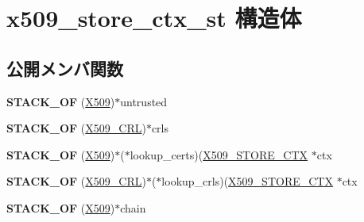 \hypertarget{structx509__store__ctx__st}{}\section{x509\+\_\+store\+\_\+ctx\+\_\+st 構造体}
\label{structx509__store__ctx__st}
\subsection*{公開メンバ関数}
\begin{DoxyCompactItemize}
\item 
\hypertarget{structx509__store__ctx__st_a546a89dab72d8fa5a48a6d250bf2f320}{}{\bfseries S\+T\+A\+C\+K\+\_\+\+O\+F} (\hyperlink{structx509__st}{X509})$\ast$untrusted\label{structx509__store__ctx__st_a546a89dab72d8fa5a48a6d250bf2f320}

\item 
\hypertarget{structx509__store__ctx__st_a97b2a77c7beeea1cf73a0ad5243f2d98}{}{\bfseries S\+T\+A\+C\+K\+\_\+\+O\+F} (\hyperlink{struct_x509__crl__st}{X509\+\_\+\+C\+R\+L})$\ast$crls\label{structx509__store__ctx__st_a97b2a77c7beeea1cf73a0ad5243f2d98}

\item 
\hypertarget{structx509__store__ctx__st_a5b90bf307077e1d7f416088bfaa39173}{}{\bfseries S\+T\+A\+C\+K\+\_\+\+O\+F} (\hyperlink{structx509__st}{X509})$\ast$($\ast$lookup\+\_\+certs)(\hyperlink{structx509__store__ctx__st}{X509\+\_\+\+S\+T\+O\+R\+E\+\_\+\+C\+T\+X} $\ast$ctx\label{structx509__store__ctx__st_a5b90bf307077e1d7f416088bfaa39173}

\item 
\hypertarget{structx509__store__ctx__st_a74148f9c29f0ba50528f877662006709}{}{\bfseries S\+T\+A\+C\+K\+\_\+\+O\+F} (\hyperlink{struct_x509__crl__st}{X509\+\_\+\+C\+R\+L})$\ast$($\ast$lookup\+\_\+crls)(\hyperlink{structx509__store__ctx__st}{X509\+\_\+\+S\+T\+O\+R\+E\+\_\+\+C\+T\+X} $\ast$ctx\label{structx509__store__ctx__st_a74148f9c29f0ba50528f877662006709}

\item 
\hypertarget{structx509__store__ctx__st_a9eecfd0e612ad76c36ffaab1fff26ae8}{}{\bfseries S\+T\+A\+C\+K\+\_\+\+O\+F} (\hyperlink{structx509__st}{X509})$\ast$chain\label{structx509__store__ctx__st_a9eecfd0e612ad76c36ffaab1fff26ae8}

\end{DoxyCompactItemize}
